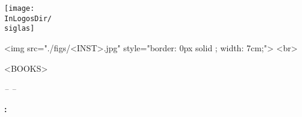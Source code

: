\pagestyle{empty}

\begin{center}
    \vspace{3cm}
    \begin{latexonly}
        \texttt{[image: \\InLogosDir/\\siglas]}\\
    \end{latexonly}
    \begin{htmlonly}
		\begin{rawhtml}
			<img src="./figs/<INST>.jpg" style="border: 0px solid ; width: 7cm;"> <br>
		\end{rawhtml}
	\end{htmlonly}
    
    \begin{huge}
        \underlogotext
    \end{huge}
    \latexhtml{\vspace{3cm}}{}

    \begin{huge}
        \doctitle
    \end{huge}
    \latexhtml{\vspace{3cm}}{}

	\begin{htmlonly}
		\begin{rawhtml}
        <BOOKS>
		\end{rawhtml}
	\end{htmlonly}

    \begin{Large}
        \textit{-- \FinalReport --}
    \end{Large}
    \latexhtml{\vspace{4cm}}{}

    \begin{Large}
        \textbf{\LastModification: \fecha}
    \end{Large}
\end{center}

